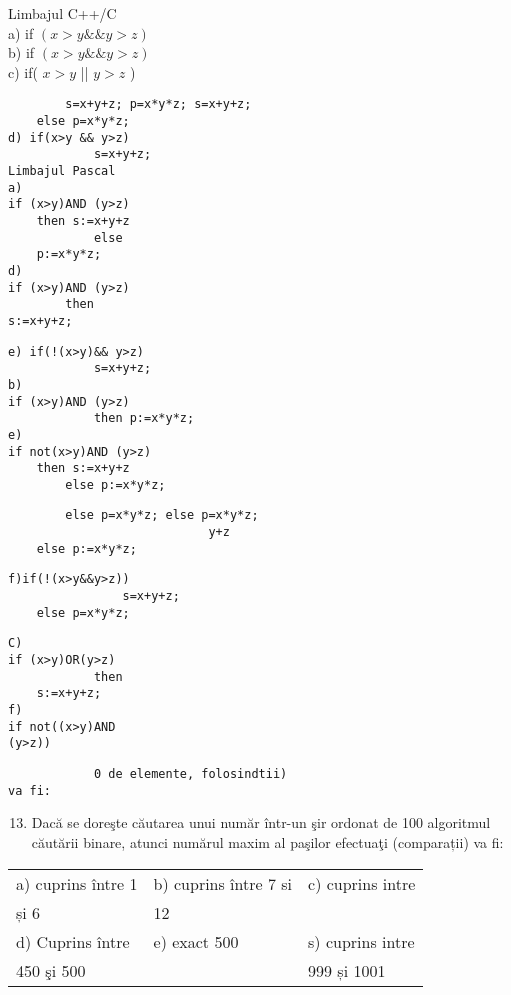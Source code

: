 Limbajul C++/C\\
a) if $(x>y \& \& y>z)$\\
b) if $(x>y \& \& y>z)$\\
c) if( $x>y$ || $y>z$ )

\begin{verbatim}
        s=x+y+z; p=x*y*z; s=x+y+z;
    else p=x*y*z;
d) if(x>y && y>z)
            s=x+y+z;
Limbajul Pascal
a)
if (x>y)AND (y>z)
    then s:=x+y+z
            else
    p:=x*y*z;
d)
if (x>y)AND (y>z)
        then
s:=x+y+z;
\end{verbatim}

\begin{verbatim}
e) if(!(x>y)&& y>z)
            s=x+y+z;
b)
if (x>y)AND (y>z)
            then p:=x*y*z;
e)
if not(x>y)AND (y>z)
    then s:=x+y+z
        else p:=x*y*z;
\end{verbatim}

\begin{verbatim}
        else p=x*y*z; else p=x*y*z;
                            y+z
    else p:=x*y*z;
\end{verbatim}

\begin{verbatim}
f)if(!(x>y&&y>z))
                s=x+y+z;
    else p=x*y*z;
\end{verbatim}

\begin{verbatim}
C)
if (x>y)OR(y>z)
            then
    s:=x+y+z;
f)
if not((x>y)AND
(y>z))
\end{verbatim}

\begin{verbatim}
            0 de elemente, folosindtii)
va fi:
\end{verbatim}

\begin{enumerate}
  \setcounter{enumi}{12}
  \item Dacă se doreşte căutarea unui număr într-un şir ordonat de 100 algoritmul căutării binare, atunci numărul maxim al paşilor efectuaţi (comparații) va fi:
\end{enumerate}

\begin{center}
\begin{tabular}{lll}
a) cuprins între 1 & b) cuprins între 7 si & c) cuprins intre \\
și 6 & 12 &  \\
d) Cuprins între & e) exact 500 & s) cuprins intre \\
450 şi 500 &  & 999 și 1001 \\
\end{tabular}
\end{center}

